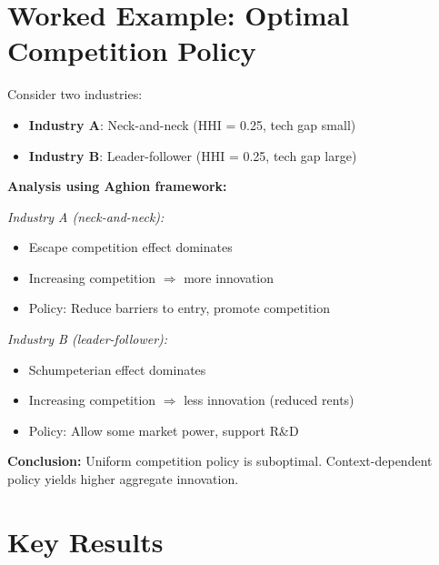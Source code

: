 \section{Worked Example: Optimal Competition Policy}

Consider two industries:
\begin{itemize}
    \item \textbf{Industry A}: Neck-and-neck (HHI = 0.25, tech gap small)
    \item \textbf{Industry B}: Leader-follower (HHI = 0.25, tech gap large)
\end{itemize}

\textbf{Analysis using Aghion framework:}

\textit{Industry A (neck-and-neck):}
\begin{itemize}
    \item Escape competition effect dominates
    \item Increasing competition $\Rightarrow$ more innovation
    \item Policy: Reduce barriers to entry, promote competition
\end{itemize}

\textit{Industry B (leader-follower):}
\begin{itemize}
    \item Schumpeterian effect dominates
    \item Increasing competition $\Rightarrow$ less innovation (reduced rents)
    \item Policy: Allow some market power, support R\&D
\end{itemize}

\textbf{Conclusion:} Uniform competition policy is suboptimal. Context-dependent policy yields higher aggregate innovation.



\section{Key Results}
\label{sec:pa-results}

